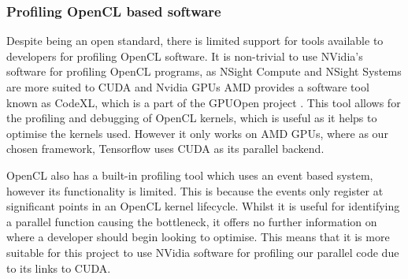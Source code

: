 {




}
\subsubsection{Profiling OpenCL based software}

Despite being an open standard, there is limited support for tools available to developers for profiling OpenCL software.
It is non-trivial to use NVidia's software for profiling OpenCL programs, as NSight Compute and NSight Systems are more suited to CUDA and Nvidia GPUs
AMD provides a software tool known as CodeXL, which is a part of the GPUOpen project \cite{gpuopen}.
This tool allows for the profiling and debugging of OpenCL kernels, which is useful as it helps to optimise the kernels used.
However it only works on AMD GPUs, where as our chosen framework, Tensorflow uses CUDA as its parallel backend.

OpenCL also has a built-in profiling tool which uses an event based system, however its functionality is limited.
This is because the events only register at significant points in an OpenCL kernel lifecycle.
Whilst it is useful for identifying a parallel function causing the bottleneck, it offers no further information on where a developer should begin looking to optimise.
This means that it is more suitable for this project to use NVidia software for profiling our parallel code due to its links to CUDA.



